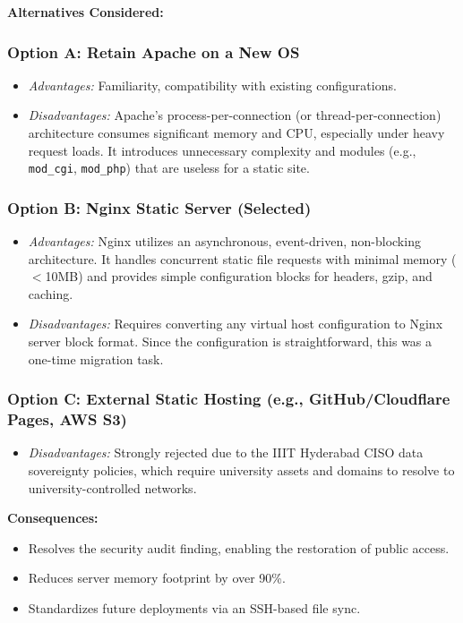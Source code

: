\documentclass[11pt,a4paper,DIV=16,headings=normal,parskip=half]{scrartcl}
\begin{document}
\textbf{Alternatives Considered:}

\subsubsection{Option A: Retain Apache on a New OS}
\begin{itemize}
\item \textit{Advantages:} Familiarity, compatibility with existing configurations.
\item \textit{Disadvantages:} Apache's process-per-connection (or thread-per-connection) architecture consumes significant memory and CPU, especially under heavy request loads. It introduces unnecessary complexity and modules (e.g., \texttt{mod\_cgi}, \texttt{mod\_php}) that are useless for a static site.
\end{itemize}

\subsubsection{Option B: Nginx Static Server (Selected)}
\begin{itemize}
\item \textit{Advantages:} Nginx utilizes an asynchronous, event-driven, non-blocking architecture. It handles concurrent static file requests with minimal memory ($<$10MB) and provides simple configuration blocks for headers, gzip, and caching.
\item \textit{Disadvantages:} Requires converting any virtual host configuration to Nginx server block format. Since the configuration is straightforward, this was a one-time migration task.
\end{itemize}

\subsubsection{Option C: External Static Hosting (e.g., GitHub/Cloudflare Pages, AWS S3)}
\begin{itemize}
\item \textit{Disadvantages:} Strongly rejected due to the IIIT Hyderabad CISO data sovereignty policies, which require university assets and domains to resolve to university-controlled networks.
\end{itemize}

\textbf{Consequences:}
\begin{itemize}
\item Resolves the security audit finding, enabling the restoration of public access.
\item Reduces server memory footprint by over 90\%.
\item Standardizes future deployments via an SSH-based file sync.
\end{itemize}
\end{document}
